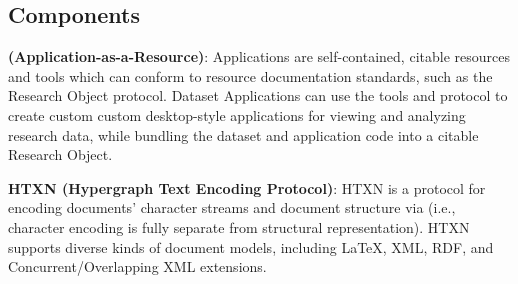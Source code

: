\atsp
\begin{frame}{}
\section{Components}

\vspace*{33pt}
{\thrulexrev}
\vspace*{-15pt}

{\fontsize{18}{22}\selectfont
\hspace*{13pt}\begin{minipage}{.97\textwidth}
\vspace{2pt}



		

{\setlength{\leftmargini}{9pt}\begin{enumerate}
\dmitem \textbf{\AtR{} (Application-as-a-Resource)}: \hspace{.25em} 
\AtR{} Applications are self-contained, citable resources and tools which 
can conform to  resource documentation standards, such as the Research Object protocol.  Dataset Applications can use the \AtR{} tools 
and protocol to create custom custom desktop-style applications 
for viewing and analyzing research data, while bundling the dataset  and application code into a citable Research Object. 
\vspace{13pt}

\dmitem \textbf{HTXN (Hypergraph Text Encoding Protocol)}:  \hspace{.25em}
HTXN is a protocol for encoding documents' character streams  
and document structure via  (i.e.,  
character encoding is fully separate from structural representation).  
HTXN supports diverse kinds of document models, including 
\LaTeX{}, XML, RDF, and Concurrent/Overlapping XML extensions. 
\vspace{13pt}


\end{enumerate}}
\end{minipage}}
\end{frame}
